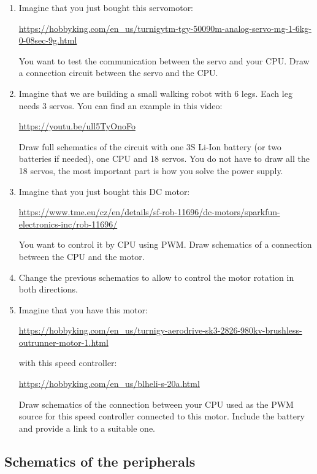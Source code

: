 \documentclass[12pt, a4paper]{article}
\begin{document}
\begin{enumerate}[resume]
	\item Imagine that you just bought this servomotor:
	
	{\scriptsize	\url{https://hobbyking.com/en_us/turnigytm-tgy-50090m-analog-servo-mg-1-6kg-0-08sec-9g.html}}
	
	You want to test the communication between the servo and your CPU. Draw a connection circuit between the servo and the CPU.
	
	\item Imagine that we are building a small walking robot with 6 legs. Each leg needs 3 servos. You can find an example in this video:
	
	\url{https://youtu.be/ull5TyOnoFo}
	
	Draw full schematics of the circuit with one 3S Li-Ion battery (or two batteries if needed), one CPU and 18 servos. You do not have to draw all the 18 servos, the most important part is how you solve the power supply.
	
	\item Imagine that you just bought this DC motor:
	
	{\scriptsize\url{https://www.tme.eu/cz/en/details/sf-rob-11696/dc-motors/sparkfun-electronics-inc/rob-11696/}}
	
	You want to control it by CPU using PWM. Draw schematics of a connection between the CPU and the motor.
	
	\item Change the previous schematics to allow to control the motor rotation in both directions.
	
	\item Imagine that you have this motor:
	
	{\scriptsize\url{https://hobbyking.com/en_us/turnigy-aerodrive-sk3-2826-980kv-brushless-outrunner-motor-1.html}}
	
	with this speed controller:
	
	{\scriptsize\url{https://hobbyking.com/en_us/blheli-s-20a.html}}
	
	Draw schematics of the connection between your CPU used as the PWM source for this speed controller connected to this motor. Include the battery and provide a link to a suitable one.
\end{enumerate}

\subsection{Schematics of the peripherals}
	
\end{document}
